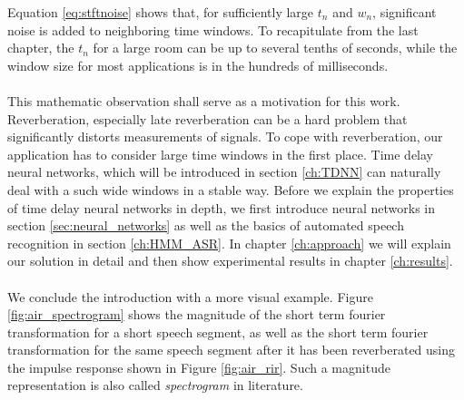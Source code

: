 Equation \ref{eq:stftnoise} shows that, for sufficiently large $t_n$ and $w_n$, significant noise is added to neighboring time windows. To recapitulate from the last chapter, the $t_n$ for a large room can be up to several tenths of seconds, while the window size for most applications is in the hundreds of milliseconds. 
\\ \\
This mathematic observation shall serve as a motivation for this work. Reverberation, especially late reverberation can be a hard problem that significantly distorts measurements of signals. To cope with reverberation, our application has to consider large time windows in the first place. Time delay neural networks, which will be introduced in section \ref{ch:TDNN} can naturally deal with a such wide windows in a stable way. Before we explain the properties of time delay neural networks in depth, we first introduce neural networks in section \ref{sec:neural_networks} as well as the basics of automated speech recognition in section \ref{ch:HMM_ASR}. In chapter \ref{ch:approach} we will explain our solution in detail and then show experimental results in chapter \ref{ch:results}.
\\ \\
We conclude the introduction with a more visual example. Figure \ref{fig:air_spectrogram} shows the magnitude of the short term fourier transformation for a short speech segment, as well as the short term fourier transformation for the same speech segment after it has been reverberated using the impulse response shown in Figure \ref{fig:air_rir}. Such a magnitude representation is also called \textit{spectrogram} in literature. 


\begin{minipage}{\linewidth}
	\label{fig:air_spectrogram}
\end{minipage}
